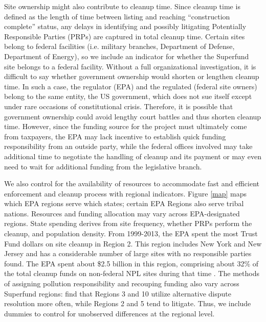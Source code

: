 \documentclass[12pt]{article}
\begin{document}
{Site ownership might also contribute to cleanup time. Since cleanup time is defined as the length of time between listing and reaching ``construction complete'' status, any delays in identifying and possibly litigating Potentially Responsible Parties (PRPs) are captured in total cleanup time. Certain sites belong to federal facilities (i.e. military branches, Department of Defense, Department of Energy), so we include an indicator for whether the Superfund site belongs to a federal facility. Without a full organizational investigation, it is difficult to say whether government ownership would shorten or lengthen cleanup time. In such a case, the regulator (EPA) and the regulated (federal site owners) belong to the same entity, the US government, which does not sue itself except under rare occasions of constitutional crisis. Therefore, it is possible that government ownership could avoid lengthy court battles and thus shorten cleanup time. However, since the funding source for the project must ultimately come from taxpayers, the EPA may lack incentive to establish quick funding responsibility from an outside party, while the federal offices involved may take additional time to negotiate the handling of cleanup and its payment or may even need to wait for additional funding from the legislative branch. 

We also control for the availability of resources to accommodate fast and efficient enforcement and cleanup process with regional indicators. Figure \ref{map} maps which EPA regions serve which states; certain EPA Regions also serve tribal nations. Resources and funding allocation may vary across EPA-designated regions. State spending derives from site frequency, whether PRPs perform the cleanup, and population density. From 1999-2013, the EPA spent the most Trust Fund dollars on site cleanup in Region 2. This region includes New York and New Jersey and has a considerable number of large sites with no responsible parties found. The EPA spent about \$2.5 billion in this region, comprising about 32\% of the total cleanup funds on non-federal NPL sites during that time \parencite{GAO2015}. The methods of assigning pollution responsibility and recouping funding also vary across Superfund regions: \textcite{church2001cleaning} find that Regions 3 and 10 utilize alternative dispute resolution more often, while Regions 2 and 5 tend to litigate. Thus, we include dummies to control for unobserved differences at the regional level.
 
}
\end{document}
